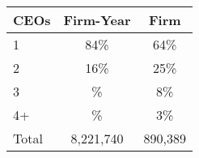 \begin{tabular}{lcc}
\toprule
CEOs & Firm-Year & Firm \\
\midrule
1 & 84\% & 64\% \\
2 & 16\% & 25\% \\
3 & \% & 8\% \\
4+ & \% & 3\% \\
Total &    8,221,740 &      890,389 \\
\bottomrule
\end{tabular}
